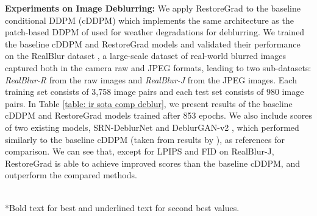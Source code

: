 \noindent\textbf{Experiments on Image Deblurring:}
We apply RestoreGrad to the baseline conditional DDPM (cDDPM) which implements the same architecture as the patch-based DDPM of \citet{ozdenizci2023restoring} used for weather degradations for deblurring. We trained the baseline cDDPM and RestoreGrad models and validated their performance on the RealBlur dataset \citep{rim_2020_ECCV}, a large-scale dataset of real-world blurred images captured both in the camera raw and JPEG formats, leading to two sub-datasets: \textit{RealBlur-R} from the raw images and \textit{RealBlur-J} from the JPEG images. Each training set consists of 3,758 image pairs and each test set consists of 980 image pairs. In Table \ref{table: ir sota comp deblur}, we present results of the baseline cDDPM and RestoreGrad models trained after 853 epochs. We also include scores of two existing models, SRN-DeblurNet \citep{tao2018scale} and DeblurGAN-v2 \citep{kupyn2019deblurgan}, which performed similarly to the baseline cDDPM (taken from results by \citet{rim_2020_ECCV}), as references for comparison. We can see that, except for LPIPS and FID on RealBlur-J, RestoreGrad is able to achieve improved scores than the baseline cDDPM, and outperform the compared methods.


\begin{table}[!th]
\centering
\begin{small}{
\setlength{\tabcolsep}{5pt} %
\caption{Image deblurring of realistic blurred images.}
\vspace{0.1cm}
\label{table: ir sota comp deblur}
\\
*Bold text for best and underlined text for second best values.
}
\end{small}
\end{table}

